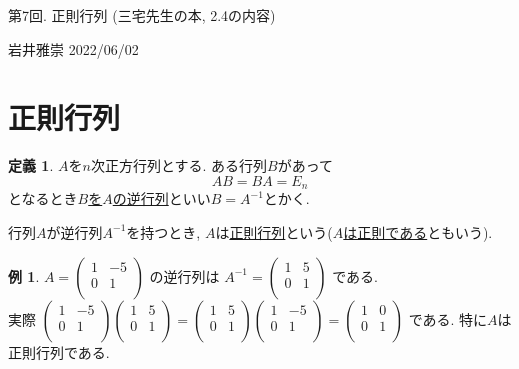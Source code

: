 \documentclass[dvipdfmx,a4paper,11pt]{article}
\theoremstyle{definition}
\newtheorem{dfn}[thm]{定義}
\newtheorem{exa}[thm]{例}
\begin{document}
\begin{center}
{\Large 第7回. 正則行列 (三宅先生の本, 2.4の内容)}
\end{center}

\begin{flushright}
 岩井雅崇 2022/06/02
\end{flushright}
\section{正則行列}

\begin{tcolorbox}[
    colback = white,
    colframe = green!35!black,
    fonttitle = \bfseries,
    breakable = true]
    \begin{dfn}
$A$を$n$次正方行列とする.
 ある行列$B$があって
 $$
 AB =BA =E_{n} %
 $$
 となるとき\underline{$B$を$A$の逆行列}といい$B=A^{-1}$とかく.
 
 行列$A$が逆行列$A^{-1}$を持つとき, $A$は\underline{正則行列}という(\underline{$A$は正則である}ともいう).
  \end{dfn}
 \end{tcolorbox}
 
 \begin{exa}
 $A=
  \begin{pmatrix}
 1& -5  \\
 0& 1  \\
 \end{pmatrix} 
 $
 の逆行列は
  $A^{-1}=
  \begin{pmatrix}
 1& 5  \\
 0& 1  \\
 \end{pmatrix} 
 $
 である. \\ 
 実際
  $
  \begin{pmatrix}
 1& -5  \\
 0& 1  \\
 \end{pmatrix} 
  \begin{pmatrix}
 1& 5  \\
 0& 1  \\
 \end{pmatrix} 
=
  \begin{pmatrix}
 1& 5  \\
 0& 1  \\
 \end{pmatrix} 
   \begin{pmatrix}
 1& -5  \\
 0& 1  \\
 \end{pmatrix} 
 =
   \begin{pmatrix}
 1& 0 \\
 0& 1  \\
 \end{pmatrix} 
 $
 である.
 特に$A$は正則行列である. 
 \end{exa}
\end{document}
